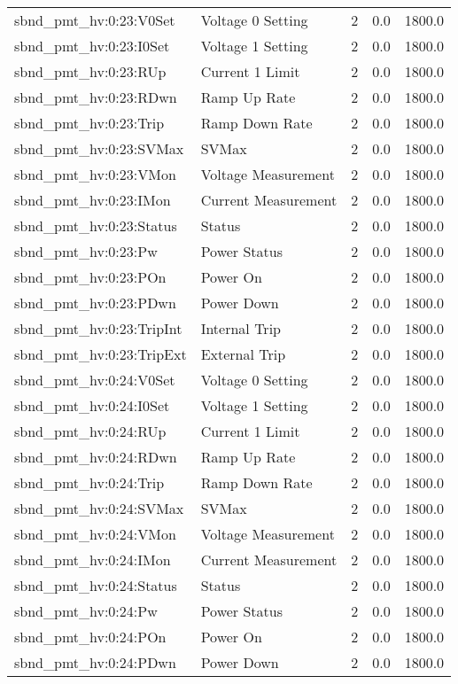 \begin{center}
\begin{longtable}{l | l l l l }
sbnd\_pmt\_hv:0:23:V0Set & Voltage 0 Setting & 2 & 0.0 & 1800.0\\ 
sbnd\_pmt\_hv:0:23:I0Set & Voltage 1 Setting & 2 & 0.0 & 1800.0\\ 
sbnd\_pmt\_hv:0:23:RUp & Current 1 Limit & 2 & 0.0 & 1800.0\\ 
sbnd\_pmt\_hv:0:23:RDwn & Ramp Up Rate & 2 & 0.0 & 1800.0\\ 
sbnd\_pmt\_hv:0:23:Trip & Ramp Down Rate & 2 & 0.0 & 1800.0\\ 
sbnd\_pmt\_hv:0:23:SVMax & SVMax & 2 & 0.0 & 1800.0\\ 
sbnd\_pmt\_hv:0:23:VMon & Voltage Measurement & 2 & 0.0 & 1800.0\\ 
sbnd\_pmt\_hv:0:23:IMon & Current Measurement & 2 & 0.0 & 1800.0\\ 
sbnd\_pmt\_hv:0:23:Status & Status & 2 & 0.0 & 1800.0\\ 
sbnd\_pmt\_hv:0:23:Pw & Power Status & 2 & 0.0 & 1800.0\\ 
sbnd\_pmt\_hv:0:23:POn & Power On & 2 & 0.0 & 1800.0\\ 
sbnd\_pmt\_hv:0:23:PDwn & Power Down & 2 & 0.0 & 1800.0\\ 
sbnd\_pmt\_hv:0:23:TripInt & Internal Trip & 2 & 0.0 & 1800.0\\ 
sbnd\_pmt\_hv:0:23:TripExt & External Trip & 2 & 0.0 & 1800.0\\ 
sbnd\_pmt\_hv:0:24:V0Set & Voltage 0 Setting & 2 & 0.0 & 1800.0\\ 
sbnd\_pmt\_hv:0:24:I0Set & Voltage 1 Setting & 2 & 0.0 & 1800.0\\ 
sbnd\_pmt\_hv:0:24:RUp & Current 1 Limit & 2 & 0.0 & 1800.0\\ 
sbnd\_pmt\_hv:0:24:RDwn & Ramp Up Rate & 2 & 0.0 & 1800.0\\ 
sbnd\_pmt\_hv:0:24:Trip & Ramp Down Rate & 2 & 0.0 & 1800.0\\ 
sbnd\_pmt\_hv:0:24:SVMax & SVMax & 2 & 0.0 & 1800.0\\ 
sbnd\_pmt\_hv:0:24:VMon & Voltage Measurement & 2 & 0.0 & 1800.0\\ 
sbnd\_pmt\_hv:0:24:IMon & Current Measurement & 2 & 0.0 & 1800.0\\ 
sbnd\_pmt\_hv:0:24:Status & Status & 2 & 0.0 & 1800.0\\ 
sbnd\_pmt\_hv:0:24:Pw & Power Status & 2 & 0.0 & 1800.0\\ 
sbnd\_pmt\_hv:0:24:POn & Power On & 2 & 0.0 & 1800.0\\ 
sbnd\_pmt\_hv:0:24:PDwn & Power Down & 2 & 0.0 & 1800.0\\ 

\end{longtable}
\end{center}

